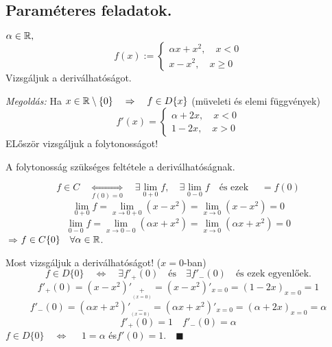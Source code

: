 \documentclass[a4paper,11.5pt]{article}
\begin{document}
	\subsection{Paraméteres feladatok.}
	\begin{task}
		$\alpha\in\mathbb{R},$
		\[ f(x):=\left\{\begin{gathered}
			\alpha x+x^2,\quad x<0\\
			x-x^2,\quad x\geq 0
		\end{gathered}\right. \]
		Vizsgáljuk a deriválhatóságot.
		
		\medskip
		\textit{Megoldás:} Ha $x\in \mathbb{R}\setminus\{0\}\quad \Rightarrow\quad f\in D\{x\}$ (müveleti és elemi függvények)
		\[ f'(x)=\left\{\begin{gathered}
			\alpha+2x,\quad x<0\\
			1-2x,\quad x>0
		\end{gathered}\right. \]
		 ELőször vizsgáljuk a folytonosságot!
		\begin{note}
			A folytonosság szükséges feltétele a deriválhatóságnak.
		\end{note}
		\[ f\in C \quad \underset{f(0)=0}{\Leftrightarrow} \quad \exists\lim_{0+0}f,\quad \exists\lim_{0-0}f\quad \text{és ezek }\quad=f(0)  \]
		\[ \lim_{0+0}f=\lim_{x\to0+0}(x-x^2)=\lim_{x\to0}(x-x^2)=0 \]
		\[ \lim_{0-0}f=\lim_{x\to0-0}(\alpha x+x^2)=\lim_{x\to0}(\alpha x+x^2)=0 \]
		$\Rightarrow$\quad $f\in C\{0\}\quad \forall \alpha\in\mathbb{R}$.
		\medskip
		
		Most vizsgáljuk a deriválhatóságot! ($x=0$-ban)
		\[ f\in D\{0\}\quad \Leftrightarrow\quad \exists f'_+(0)\quad \text{és}\quad \exists f'_-(0) \quad \text{és ezek egyenlőek.} \]
		\[ f'_+(0)=(x-x^2)'_{\underset{(x=0)}{+}}=(x-x^2)'_{x=0}=(1-2x)_{x=0}=1 \]
		\[ f'_-(0)=(\alpha x+x^2)'_{\underset{(x=0)}{-}}=(\alpha x+x^2)'_{x=0}=(\alpha+2x)_{x=0}=\alpha \]
		\[ f'_+(0)=1\quad f'_-(0)=\alpha \]
		$f\in D\{0\}\quad \Longleftrightarrow\quad$ $1=\alpha$ \quad és\quad $f'(0)=1.\quad \blacksquare$
	\end{task}
\end{document}
